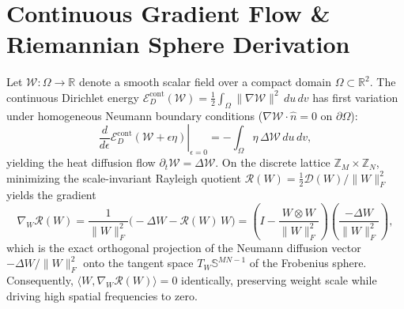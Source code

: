 \documentclass[11pt,a4paper]{article}
\begin{document}
\section{Continuous Gradient Flow \& Riemannian Sphere Derivation}
\label{sec:appendix_derivation}
Let $\mathcal{W}: \Omega \to \mathbb{R}$ denote a smooth scalar field over a compact domain $\Omega \subset \mathbb{R}^2$. The continuous Dirichlet energy $\mathcal{E}_D^{\text{cont}}(\mathcal{W}) = \frac{1}{2}\int_\Omega \|\nabla \mathcal{W}\|^2\,du\,dv$ has first variation under homogeneous Neumann boundary conditions ($\nabla \mathcal{W}\cdot\hat{n}=0$ on $\partial\Omega$):
\begin{equation}
    \left.\frac{d}{d\epsilon} \mathcal{E}_D^{\text{cont}}(\mathcal{W} + \epsilon \eta)\right|_{\epsilon=0} = -\int_\Omega \eta\,\Delta \mathcal{W}\,du\,dv,
\end{equation}
yielding the heat diffusion flow $\partial_t \mathcal{W} = \Delta \mathcal{W}$. On the discrete lattice $\mathbb{Z}_M \times \mathbb{Z}_N$, minimizing the scale-invariant Rayleigh quotient $\mathcal{R}(W) = \frac{1}{2}\mathcal{D}(W)/\|W\|_F^2$ yields the gradient
\begin{equation}
    \nabla_W \mathcal{R}(W) = \frac{1}{\|W\|_F^2}\Big(-\Delta W - \mathcal{R}(W)\,W\Big) = \left(I - \frac{W \otimes W}{\|W\|_F^2}\right)\left(\frac{-\Delta W}{\|W\|_F^2}\right),
\end{equation}
which is the exact orthogonal projection of the Neumann diffusion vector $-\Delta W / \|W\|_F^2$ onto the tangent space $T_W \mathbb{S}^{MN-1}$ of the Frobenius sphere. Consequently, $\langle W, \nabla_W \mathcal{R}(W) \rangle = 0$ identically, preserving weight scale while driving high spatial frequencies to zero.
\end{document}
